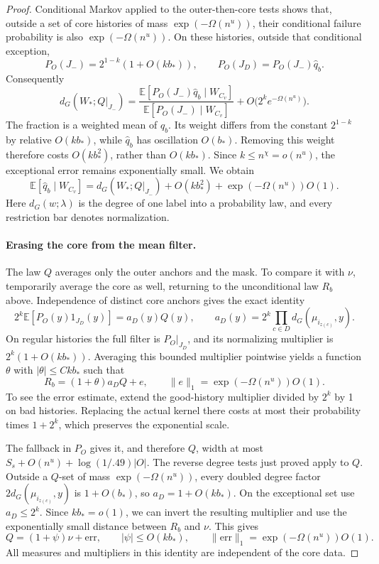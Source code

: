 \begin{proof}
Conditional Markov applied to the outer-then-core tests shows that, outside a set of core histories of mass \(\exp(-\Omega(n^u))\), their conditional failure probability is also \(\exp(-\Omega(n^u))\). On these histories, outside that conditional exception,
\[
 P_O(J_-)=2^{1-k}(1+O(kb_*)),\qquad
 P_O(J_D)=P_O(J_-)\widehat q_b.
\]
Consequently
\[
 d_G(W_*;Q|_{J_-})
 =\frac{\mathbb E[P_O(J_-)\widehat q_b\mid W_{C_v}]}
        {\mathbb E[P_O(J_-)\mid W_{C_v}]}
   +O\bigl(2^k e^{-\Omega(n^u)}\bigr).
\]
The fraction is a weighted mean of \(\widehat q_b\). Its weight differs from the constant \(2^{1-k}\) by relative \(O(kb_*)\), while \(\widehat q_b\) has oscillation \(O(b_*)\). Removing this weight therefore costs \(O(kb_*^2)\), rather than \(O(kb_*)\). Since \(k\le n^\chi=o(n^u)\), the exceptional error remains exponentially small. We obtain
\[
 \mathbb E[\widehat q_b\mid W_{C_v}]
 =d_G(W_*;Q|_{J_-})+O(kb_*^2)+\exp(-\Omega(n^u))O(1).
\]
Here \(d_G(w;\lambda)\) is the degree of one label into a probability law, and every restriction bar denotes normalization.

\paragraph{Erasing the core from the mean filter.}
The law \(Q\) averages only the outer anchors and the mask. To compare it with \(\nu\), temporarily average the core as well, returning to the unconditional law \(R_b\) above. Independence of distinct core anchors gives the exact identity
\[
 2^k\mathbb E[P_O(y)1_{J_D}(y)]=a_D(y)Q(y),\qquad
 a_D(y)=2^k\prod_{c\in D}d_G(\mu_{i_{z(c)}},y).
\]
On regular histories the full filter is \(P_O|_{J_D}\), and its normalizing multiplier is \(2^k(1+O(kb_*))\). Averaging this bounded multiplier pointwise yields a function \(\theta\) with \(|\theta|\le Ckb_*\) such that
\[
 R_b=(1+\theta)a_DQ+e,\qquad
 \|e\|_1=\exp(-\Omega(n^u))O(1).
\]
To see the error estimate, extend the good-history multiplier divided by \(2^k\) by 1 on bad histories. Replacing the actual kernel there costs at most their probability times \(1+2^k\), which preserves the exponential scale.

The fallback in \(P_O\) gives it, and therefore \(Q\), width at most
\(S_s+O(n^u)+\log(1/.49)|O|\).
The reverse degree tests just proved apply to \(Q\). Outside a \(Q\)-set of mass \(\exp(-\Omega(n^u))\), every doubled degree factor \(2d_G(\mu_{i_{z(c)}},y)\) is \(1+O(b_*)\), so \(a_D=1+O(kb_*)\). On the exceptional set use \(a_D\le2^k\). Since \(kb_*=o(1)\), we can invert the resulting multiplier and use the exponentially small distance between \(R_b\) and \(\nu\). This gives
\[
 Q=(1+\psi)\nu+\mathrm{err},\qquad
 |\psi|\le O(kb_*),\qquad
 \|\mathrm{err}\|_1=\exp(-\Omega(n^u))O(1).
\]
All measures and multipliers in this identity are independent of the core data.


\end{proof}
